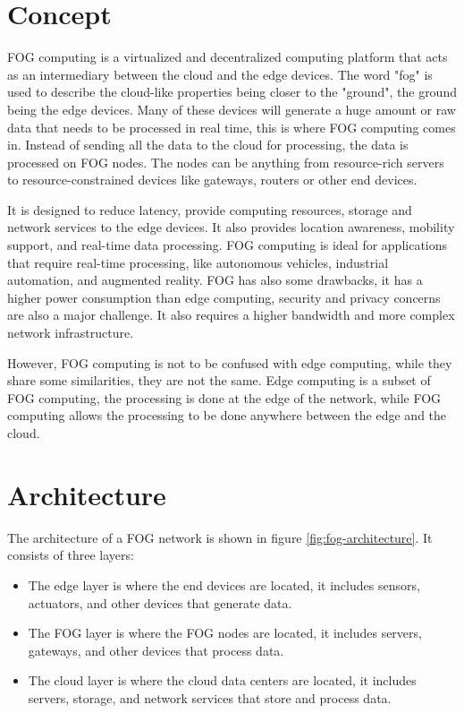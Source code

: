 \section{Concept}
\label{sec:fog-concept}

FOG computing is a virtualized and decentralized computing platform that acts as an intermediary between the cloud and
the edge devices. The word "fog" is used to describe the cloud-like properties being closer to the "ground", the ground
being the edge devices. Many of these devices will generate a huge amount or raw data that needs to be processed in real
time, this is where FOG computing comes in. Instead of sending all the data to the cloud for processing, the data is
processed on FOG nodes. The nodes can be anything from resource-rich servers to resource-constrained devices like
gateways, routers or other end devices.

It is designed to reduce latency, provide computing resources, storage and network services to the edge devices. It also
provides location awareness, mobility support, and real-time data processing. FOG computing is ideal for applications that
require real-time processing, like autonomous vehicles, industrial automation, and augmented reality. FOG has also some
drawbacks, it has a higher power consumption than edge computing, security and privacy concerns are also a major challenge.
It also requires a higher bandwidth and more complex network infrastructure.

However, FOG computing is not to be confused with edge computing, while they share some similarities, they are not the
same. Edge computing is a subset of FOG computing, the processing is done at the edge of the network, while FOG computing
allows the processing to be done anywhere between the edge and the cloud.\cite{onlogic,gfg,baeldung}

\section{Architecture}
\label{sec:fog-architecture}

The architecture of a FOG network is shown in figure \ref{fig:fog-architecture}. It consists of three layers:
\begin{itemize}
	\item The edge layer is where the end devices are located, it includes sensors, actuators, and other devices that
	      generate data.
	\item The FOG layer is where the FOG nodes are located, it includes servers, gateways, and other devices that
	      process data.
	\item The cloud layer is where the cloud data centers are located, it includes servers, storage, and network
	      services that store and process data.
\end{itemize}

